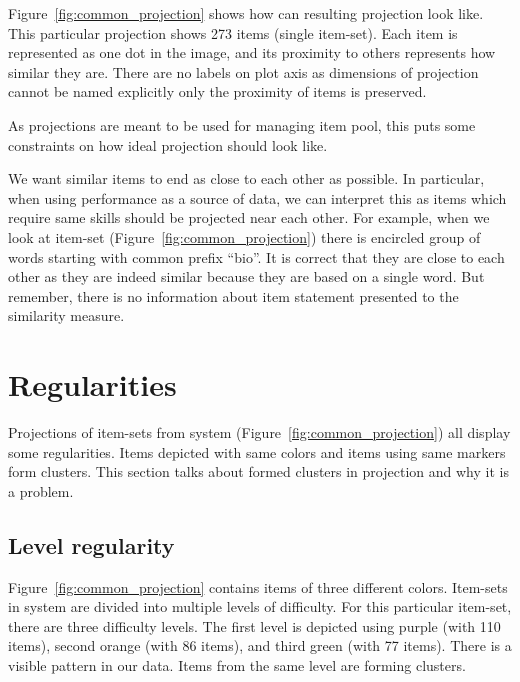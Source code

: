 \documentclass[
  print, %
  table,   %
  nolof,     %
  nolot,     %
  nocover,
  color,
  final,
]{fithesis3}
\begin{document}

Figure~\ref{fig:common_projection} shows how can resulting projection look like. This particular projection shows 273 items (single item-set). Each item is represented as one dot in the image, and its proximity to others represents how similar they are. There are no labels on plot axis as dimensions of projection cannot be named explicitly only the proximity of items is preserved.


As projections are meant to be used for managing item pool, this puts some constraints on how ideal projection should look like.

We want similar items to end as close to each other as possible. In particular, when using performance as a source of data, we can interpret this as items which require same skills should be projected near each other. For example, when we look at item-set \cviceniB{} (Figure~\ref{fig:common_projection}) there is encircled group of words starting with common prefix ``bio''. It is correct that they are close to each other as they are indeed similar because they are based on a single word. But remember, there is no information about item statement presented to the similarity measure.


\section{Regularities}\label{regularities}


Projections of item-sets from system \umimeCesky{} (Figure~\ref{fig:common_projection}) all display some regularities. Items depicted with same colors and items using same markers form clusters. This section talks about formed clusters in projection and why it is a problem.


\subsection{Level regularity}\label{regularities-level-regularity}


Figure~\ref{fig:common_projection} contains items of three different colors. Item-sets in system \umimeCesky{} are divided into multiple levels of difficulty. For this particular item-set, there are three difficulty levels. The first level is depicted using purple (with 110 items), second orange (with 86 items), and third green (with 77 items). There is a visible pattern in our data. Items from the same level are forming clusters.
\end{document}
